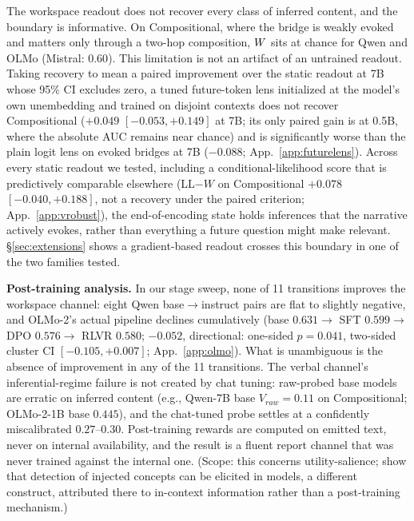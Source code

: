 The workspace readout does not recover every class of inferred content, and the
boundary is informative.
On Compositional, where the bridge is weakly evoked and matters only through a two-hop
composition, $W$ sits at chance for Qwen and OLMo (Mistral: $0.60$). This limitation is not an artifact of an untrained readout. Taking recovery
to mean a paired improvement over the static readout at 7B whose 95\% CI
excludes zero, a tuned future-token lens initialized at the model's own
unembedding and trained on disjoint contexts
\citep{pal2023futurelens,belrose2023tuned} does not recover Compositional
($+0.049$ $[-0.053, +0.149]$ at 7B; its only paired gain is at 0.5B, where
the absolute AUC remains near chance) and is significantly worse than the
plain logit lens on evoked bridges at 7B ($-0.088$;
App.~\ref{app:futurelens}). Across every static readout we tested, including a conditional-likelihood
score that is predictively comparable elsewhere (LL$-W$ on Compositional
$+0.078$ $[-0.040, +0.188]$, not a recovery under the paired criterion;
App.~\ref{app:vrobust}), the end-of-encoding state holds inferences that the
narrative actively evokes, rather than everything a future question might
make relevant. \S\ref{sec:extensions}
shows a gradient-based readout crosses this boundary in one of the two
families tested.

\textbf{Post-training analysis.}
In our stage sweep, none of 11 transitions improves the workspace channel:
eight Qwen base$\to$instruct pairs are flat to slightly negative, and OLMo-2's actual
pipeline declines cumulatively (base $0.631 \to$ SFT $0.599 \to$ DPO $0.576
\to$ RLVR $0.580$; $-0.052$, directional: one-sided $p{=}0.041$, two-sided
cluster CI $[-0.105, +0.007]$; App.~\ref{app:olmo}). What is unambiguous is
the absence of improvement in any of the 11 transitions. The
verbal channel's inferential-regime failure is not created by chat tuning:
raw-probed base models are erratic on inferred content (e.g., Qwen-7B
base $V_{raw}{=}0.11$ on Compositional; OLMo-2-1B base $0.445$), and the chat-tuned probe
settles at a confidently miscalibrated $0.27$--$0.30$. Post-training rewards are computed on emitted text, never on internal
availability, and the result is a fluent report channel that was never trained
against the internal one. (Scope: this concerns utility-salience; \citet{latentintrospection2026} show
that detection of injected concepts can be elicited in models, a different
construct, attributed there to in-context information rather than a
post-training mechanism.)


